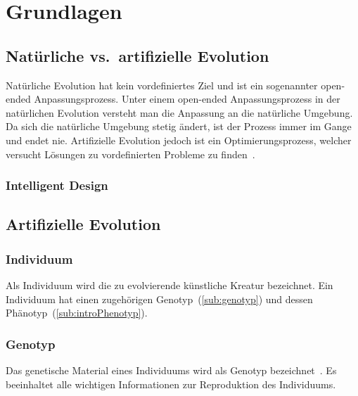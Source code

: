 %
%


\chapter{Grundlagen}

\section{Natürliche vs.\ artifizielle Evolution}

  Natürliche Evolution hat kein vordefiniertes Ziel und ist ein sogenannter open-ended Anpassungsprozess.
  Unter einem open-ended Anpassungsprozess in der natürlichen Evolution versteht man die Anpassung an die natürliche Umgebung.
  Da sich die natürliche Umgebung stetig ändert, ist der Prozess immer im Gange und endet nie.
  Artifizielle Evolution jedoch ist ein Optimierungsprozess,
  welcher versucht Lösungen zu vordefinierten Probleme zu finden~\cite[S.1]{book:bioInspired}.

  \subsection{Intelligent Design\label{sub:IntelligentDesign}}


\section{Artifizielle Evolution}

    \subsection{Individuum\label{sub:individual}}

      Als Individuum wird die zu evolvierende künstliche Kreatur bezeichnet.
      Ein Individuum hat einen zugehörigen Genotyp~(\vref{sub:genotyp}) und dessen Phänotyp~(\vref{sub:introPhenotyp}).

    \subsection{Genotyp\label{sub:genotyp}}

      Das genetische Material eines Individuums wird als Genotyp bezeichnet~\cite[S.5]{book:bioInspired}.
      Es beeinhaltet alle wichtigen Informationen zur Reproduktion des Individuums.

